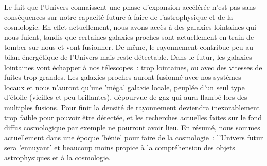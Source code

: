 Le fait que l'Univers connaissent une phase d'expansion accélérée n'est pas sans conséquences sur notre capacité future à faire de l'astrophysique et de la cosmologie. En effet actuellement, nous avons accès à des galaxies lointaines qui nous fuient, tandis que certaines galaxies proches sont actuellement en train de tomber sur nous et vont fusionner. De même, le rayonnement contribue peu au bilan énergétique de l'Univers mais reste détectable. Dans le futur, les galaxies lointaines vont échapper à nos télescopes~: trop lointaines, ou avec des vitesses de fuites trop grandes. Les galaxies proches auront fusionné avec nos systèmes locaux et nous n'auront qu'une 'méga' galaxie locale, peuplée d'un seul type d'étoile (vieilles et peu brillantes), dépourvue de gaz qui aura flambé lors des multiples fusions. Pour finir la densité de rayonnement deviendra inexorablement trop faible pour pouvoir être détectée, et les recherches actuelles faites sur le fond diffus cosmologique par exemple ne pourront avoir lieu. En résumé, nous sommes actuellement dans une époque 'bénie' pour faire de la cosmologie~: l'Univers futur sera 'ennuyant' et beaucoup moins propice à la compréhension des objets astrophysiques et à la cosmologie.